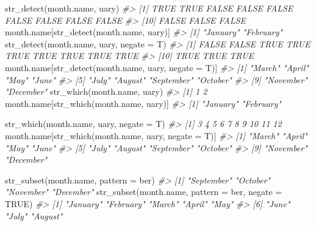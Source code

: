\documentclass[
]{book}
\newenvironment{Shaded}{\begin{snugshade}}{\end{snugshade}}
\newcommand{\AttributeTok}[1]{\textcolor[rgb]{0.77,0.63,0.00}{#1}}
\newcommand{\CommentTok}[1]{\textcolor[rgb]{0.56,0.35,0.01}{\textit{#1}}}
\newcommand{\ConstantTok}[1]{\textcolor[rgb]{0.00,0.00,0.00}{#1}}
\newcommand{\FunctionTok}[1]{\textcolor[rgb]{0.00,0.00,0.00}{#1}}
\newcommand{\NormalTok}[1]{#1}
\newcommand{\StringTok}[1]{\textcolor[rgb]{0.31,0.60,0.02}{#1}}
\begin{document}
\begin{Shaded}
\begin{Highlighting}[]
\FunctionTok{str\_detect}\NormalTok{(month.name, }\StringTok{\textquotesingle{}uary\textquotesingle{}}\NormalTok{)}
\CommentTok{\#\textgreater{}  [1]  TRUE  TRUE FALSE FALSE FALSE FALSE FALSE FALSE FALSE}
\CommentTok{\#\textgreater{} [10] FALSE FALSE FALSE}
\NormalTok{month.name[}\FunctionTok{str\_detect}\NormalTok{(month.name, }\StringTok{\textquotesingle{}uary\textquotesingle{}}\NormalTok{)]}
\CommentTok{\#\textgreater{} [1] "January"  "February"}
\FunctionTok{str\_detect}\NormalTok{(month.name, }\StringTok{\textquotesingle{}uary\textquotesingle{}}\NormalTok{, }\AttributeTok{negate =}\NormalTok{ T)}
\CommentTok{\#\textgreater{}  [1] FALSE FALSE  TRUE  TRUE  TRUE  TRUE  TRUE  TRUE  TRUE}
\CommentTok{\#\textgreater{} [10]  TRUE  TRUE  TRUE}
\NormalTok{month.name[}\FunctionTok{str\_detect}\NormalTok{(month.name, }\StringTok{\textquotesingle{}uary\textquotesingle{}}\NormalTok{, }\AttributeTok{negate =}\NormalTok{ T)]}
\CommentTok{\#\textgreater{}  [1] "March"     "April"     "May"       "June"     }
\CommentTok{\#\textgreater{}  [5] "July"      "August"    "September" "October"  }
\CommentTok{\#\textgreater{}  [9] "November"  "December"}
\FunctionTok{str\_which}\NormalTok{(month.name, }\StringTok{\textquotesingle{}uary\textquotesingle{}}\NormalTok{)}
\CommentTok{\#\textgreater{} [1] 1 2}
\NormalTok{month.name[}\FunctionTok{str\_which}\NormalTok{(month.name, }\StringTok{\textquotesingle{}uary\textquotesingle{}}\NormalTok{)]}
\CommentTok{\#\textgreater{} [1] "January"  "February"}

\FunctionTok{str\_which}\NormalTok{(month.name, }\StringTok{\textquotesingle{}uary\textquotesingle{}}\NormalTok{, }\AttributeTok{negate =}\NormalTok{ T)}
\CommentTok{\#\textgreater{}  [1]  3  4  5  6  7  8  9 10 11 12}
\NormalTok{month.name[}\FunctionTok{str\_which}\NormalTok{(month.name, }\StringTok{\textquotesingle{}uary\textquotesingle{}}\NormalTok{, }\AttributeTok{negate =}\NormalTok{ T)]}
\CommentTok{\#\textgreater{}  [1] "March"     "April"     "May"       "June"     }
\CommentTok{\#\textgreater{}  [5] "July"      "August"    "September" "October"  }
\CommentTok{\#\textgreater{}  [9] "November"  "December"}

\FunctionTok{str\_subset}\NormalTok{(month.name, }\AttributeTok{pattern =} \StringTok{\textquotesingle{}ber\textquotesingle{}}\NormalTok{)}
\CommentTok{\#\textgreater{} [1] "September" "October"   "November"  "December"}
\FunctionTok{str\_subset}\NormalTok{(month.name, }\AttributeTok{pattern =} \StringTok{\textquotesingle{}ber\textquotesingle{}}\NormalTok{, }\AttributeTok{negate =} \ConstantTok{TRUE}\NormalTok{)}
\CommentTok{\#\textgreater{} [1] "January"  "February" "March"    "April"    "May"     }
\CommentTok{\#\textgreater{} [6] "June"     "July"     "August"}
\end{Highlighting}
\end{Shaded}
\end{document}

